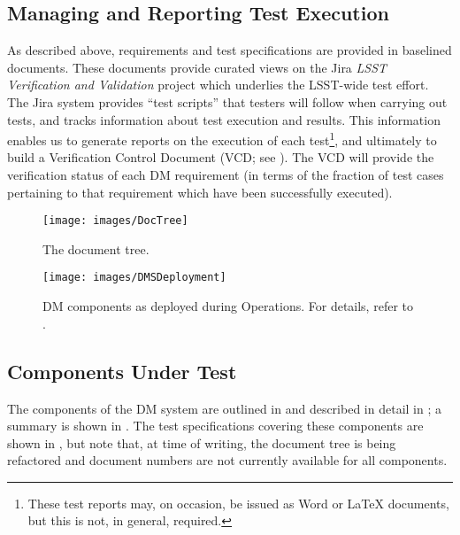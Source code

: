 \subsection{Managing and Reporting Test Execution}
\label{sect:reports}

As described above, requirements and test specifications are provided in baselined documents.
These documents provide curated views on the Jira \emph{LSST Verification and Validation} project which underlies the LSST-wide test effort.
The Jira system provides ``test scripts'' that testers will follow when carrying out tests, and tracks information about test execution and results.
This information enables us to generate reports on the execution of each test\footnote{These test reports may, on occasion, be issued as Word or \LaTeX{} documents, but this is not, in general, required.}, and ultimately to build a Verification Control Document (VCD; see ).
The VCD will provide the verification status of each DM requirement (in terms of the fraction of test cases pertaining to that requirement which have been successfully executed).

\begin{figure}
\begin{center}
 \texttt{[image: images/DocTree]}

 \caption{The \product{} document tree.}
 \label{fig:doctree}

\end{center}
\end{figure}

\begin{figure}[htbp]
	\begin{center}
		\texttt{[image: images/DMSDeployment]}
		\caption{DM components as deployed during Operations. For details, refer to .
		\label{fig:dmsdeploy}}
	\end{center}
\end{figure}

\subsection{Components Under Test}
\label{sect:components}

The components of the DM system are outlined in  and described in detail in ; a summary is shown in .
The test specifications covering these components are shown in , but note that, at time of writing, the document tree is being refactored and document numbers are not currently available for all components.

